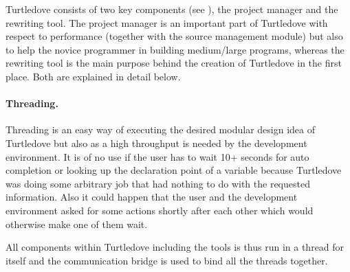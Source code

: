 Turtledove consists of two key components (see ),
the project manager and the rewriting tool. The project manager is an important
part of Turtledove with respect to performance (together with the source
management module) but also to help the novice
programmer in building medium/large programs, whereas the rewriting tool is the
main purpose behind the creation of Turtledove in the first place. Both are
explained in detail below.

\paragraph{Threading.}

Threading is an easy way of executing the desired modular design idea of
Turtledove but also as a high throughput is needed by the development
environment. It is of no use if the user has to wait 10+ seconds for auto
completion or looking up the declaration point of a variable because Turtledove
was doing some arbitrary job that had nothing to do with the requested
information. Also it could happen that the user and the development environment
asked for some actions shortly after each other which would otherwise make one
of them wait.

All components within Turtledove including the tools is thus run in a thread for
itself and the communication bridge is used to bind all the threads together.









% 

